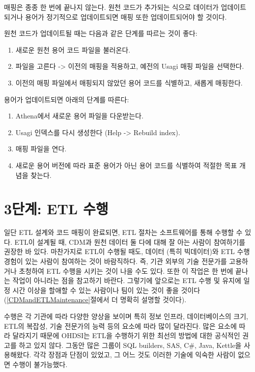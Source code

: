 \documentclass[10.5pt]{book}
\providecommand{\tightlist}{%
  \setlength{\itemsep}{0pt}\setlength{\parskip}{0pt}}
\theoremstyle{definition}
\theoremstyle{definition}
\theoremstyle{definition}
\theoremstyle{remark}
\begin{document}
매핑은 종종 한 번에 끝나지 않는다. 원천 코드가 추가되는 식으로 데이터가
업데이트되거나 용어가 정기적으로 업데이트되면 매핑 또한 업데이트되어야
할 것이다.

원천 코드가 업데이트될 때는 다음과 같은 단계를 따르는 것이 좋다:

\begin{enumerate}
\def\labelenumi{\arabic{enumi}.}
\tightlist
\item
  새로운 원천 용어 코드 파일을 불러온다.
\item
  파일을 고른다 -\textgreater{} 이전의 매핑을 적용하고, 예전의 Usagi
  매핑 파일을 선택한다.
\item
  이전의 매핑 파일에서 매핑되지 않았던 용어 코드를 식별하고, 새롭게
  매핑한다.
\end{enumerate}

용어가 업데이트되면 아래의 단계를 따른다:

\begin{enumerate}
\def\labelenumi{\arabic{enumi}.}
\tightlist
\item
  Athena에서 새로운 용어 파일을 다운받는다.
\item
  Usagi 인덱스를 다시 생성한다 (Help -\textgreater{} Rebuild index).
\item
  매핑 파일을 연다.
\item
  새로운 용어 버전에 따라 표준 용어가 아닌 용어 코드를 식별하여 적절한
  목표 개념을 찾는다.
\end{enumerate}

\section{3단계: ETL 수행}\label{-etl-}

일단 ETL 설계와 코드 매핑이 완료되면, ETL 절차는 소프트웨어를 통해
수행할 수 있다. ETL이 설계될 때, CDM과 원천 데이터 둘 다에 대해 잘 아는
사람이 참여하기를 권장한 바 있다. 마찬가지로 ETL이 수행될 때도, 데이터
(특히 빅데이터)와 ETL 수행 경험이 있는 사람이 참여하는 것이 바람직하다.
즉, 기관 외부의 기술 전문가를 고용하거나 초청하여 ETL 수행을 시키는 것이
나을 수도 있다. 또한 이 작업은 한 번에 끝나는 작업이 아니라는 점을
참고하기 바란다. 그렇기에 앞으로는 ETL 수행 및 유지에 일정 시간 이상을
할애할 수 있는 사람이나 팀이 있는 것이 좋을 것이다
(\ref{CDMandETLMaintenance}절에서 더 명확히 설명할 것이다).

수행은 각 기관에 따라 다양한 양상을 보이며 특히 정보 인프라,
데이터베이스의 크기, ETL의 복잡성, 기술 전문가의 능력 등의 요소에 따라
많이 달라진다. 많은 요소에 따라 달라지기 때문에 OHDSI는 ETL을 수행하기
위한 최선의 방법에 대한 공식적인 권고를 하고 있지 않다. 그동안 많은
그룹이 SQL builders, SAS, C\#, Java, Kettle을 사용해왔다. 각각 장점과
단점이 있었고, 그 어느 것도 이러한 기술에 익숙한 사람이 없으면 수행이
불가능했다.
\end{document}
